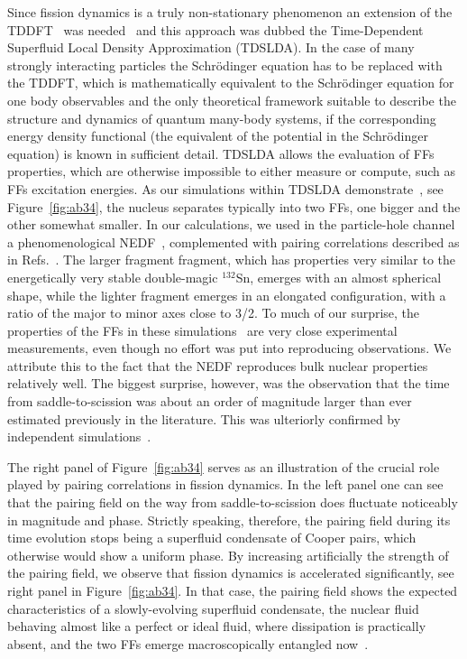 \documentclass{webofc}
\begin{document}
Since fission dynamics is a truly non-stationary phenomenon an
extension of the TDDFT~\cite{hk,ks,monograph1,monograph2} was needed~\cite{ARNPS__2013}
and this approach was dubbed the Time-Dependent Superfluid Local
Density Approximation (TDSLDA).
In the case of many strongly
interacting particles the Schr\"{o}dinger equation has to be replaced with the
TDDFT, which is mathematically equivalent to the Schr\"{o}dinger equation for one body observables and the only theoretical framework suitable to describe the structure and dynamics of
quantum many-body systems, if the corresponding energy density functional (the equivalent of the potential in the Schr\"{o}dinger equation) is known in sufficient detail.
TDSLDA allows the evaluation of  FFs properties, which are otherwise impossible to either measure or
compute, such as FFs excitation energies.
As our simulations within TDSLDA  demonstrate~\cite{Bulgac:2016}, see Figure~\ref{fig:ab34},
the nucleus separates typically into two FFs, one bigger
and the other somewhat smaller. In our calculations, we used in the particle-hole channel a
phenomenological NEDF~\cite{NuclPhys_1998},  complemented
with pairing correlations described as in Refs.~\cite{PRL__2002,PRL__2003a}.
The larger fragment fragment, which has
properties very similar to the energetically very stable double-magic
$^{132}$Sn, emerges with an almost spherical shape, while the lighter
fragment emerges in an elongated configuration, with a ratio
of the major to minor axes close to 3/2.
To much of our surprise, the properties of the FFs in these simulations~\cite{Bulgac:2016} are
very close experimental measurements, even though no effort was put into reproducing observations.
We attribute this to the fact that the NEDF reproduces bulk nuclear properties
relatively well. The biggest surprise, however, was the observation that the time from
saddle-to-scission was about an order of magnitude larger than ever estimated previously in the literature.
This was ulteriorly confirmed by independent simulations~\cite{Tanimura}.

The right panel of Figure~\ref{fig:ab34} serves as an illustration of the crucial role
played by pairing correlations in fission dynamics. In the left panel one can see that the
pairing field on the way from saddle-to-scission does fluctuate noticeably in magnitude and
phase. Strictly speaking, therefore, the pairing field during its time evolution stops being a
superfluid condensate of Cooper pairs, which otherwise would show a uniform phase. By
increasing artificially the strength of the pairing field, we observe that fission dynamics
is accelerated significantly, see right panel in Figure~\ref{fig:ab34}. In that case, the pairing field shows
the expected characteristics of a slowly-evolving superfluid condensate,
the nuclear fluid behaving almost like a perfect or ideal fluid, where dissipation is
practically absent, and the two FFs emerge macroscopically entangled now~\cite{Bulgac:2017}.
\end{document}
